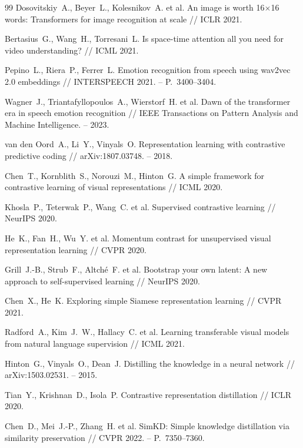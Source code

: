 \documentclass[a4paper, 12pt, oneside, openany]{article}
\begin{document}
\begin{thebibliography}{99}
Dosovitskiy~A., Beyer~L., Kolesnikov~A. et al. An image is worth 16$\times$16 words: Transformers for image recognition at scale // ICLR 2021.

Bertasius~G., Wang~H., Torresani~L. Is space-time attention all you need for video understanding? // ICML 2021.

Pepino~L., Riera~P., Ferrer~L. Emotion recognition from speech using wav2vec 2.0 embeddings // INTERSPEECH 2021. -- P.~3400--3404.

Wagner~J., Triantafyllopoulos~A., Wierstorf~H. et al. Dawn of the transformer era in speech emotion recognition // IEEE Transactions on Pattern Analysis and Machine Intelligence. -- 2023.

van den Oord~A., Li~Y., Vinyals~O. Representation learning with contrastive predictive coding // arXiv:1807.03748. -- 2018.

Chen~T., Kornblith~S., Norouzi~M., Hinton~G. A simple framework for contrastive learning of visual representations // ICML 2020.

Khosla~P., Teterwak~P., Wang~C. et al. Supervised contrastive learning // NeurIPS 2020.

He~K., Fan~H., Wu~Y. et al. Momentum contrast for unsupervised visual representation learning // CVPR 2020.

Grill~J.-B., Strub~F., Altché~F. et al. Bootstrap your own latent: A new approach to self-supervised learning // NeurIPS 2020.

Chen~X., He~K. Exploring simple Siamese representation learning // CVPR 2021.

Radford~A., Kim~J.~W., Hallacy~C. et al. Learning transferable visual models from natural language supervision // ICML 2021.

Hinton~G., Vinyals~O., Dean~J. Distilling the knowledge in a neural network // arXiv:1503.02531. -- 2015.

Tian~Y., Krishnan~D., Isola~P. Contrastive representation distillation // ICLR 2020.

Chen~D., Mei~J.-P., Zhang~H. et al. SimKD: Simple knowledge distillation via similarity preservation // CVPR 2022. -- P.~7350--7360.


\end{thebibliography}
\end{document}

